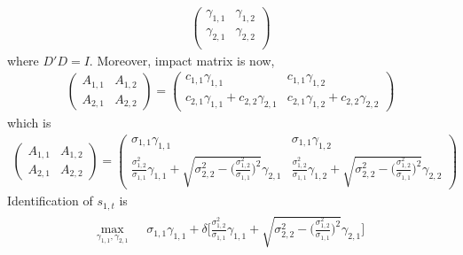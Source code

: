 \documentclass[14pt]{article}
\begin{document}
{\begin{eqnarray}
\begin{pmatrix}
\gamma_{1,1} & \gamma_{1,2} \\
\gamma_{2,1} & \gamma_{2,2} \\
\end{pmatrix} 
\end{eqnarray}
where $D'D = I$. Moreover, impact matrix is now,
\begin{eqnarray}
\begin{pmatrix}
A_{1,1} & A_{1,2} \\
A_{2,1} & A_{2,2}
\end{pmatrix} = \begin{pmatrix}
c_{1,1} \gamma_{1,1} & c_{1,1} \gamma_{1,2} \\
c_{2,1} \gamma_{1,1} + c_{2,2} \gamma_{2,1} & c_{2,1} \gamma_{1,2} + c_{2,2} \gamma_{2,2}
\end{pmatrix}
\end{eqnarray}
which is
\begin{eqnarray}
\begin{pmatrix}
A_{1,1} & A_{1,2} \\
A_{2,1} & A_{2,2}
\end{pmatrix} = \begin{pmatrix}
\sigma_{1,1} \gamma_{1,1} & \sigma_{1,1} \gamma_{1,2} \\
\frac{\sigma_{1,2}^2}{\sigma_{1,1}} \gamma_{1,1} + \sqrt{\sigma_{2,2}^2 - \Big( \frac{\sigma_{1,2}^2}{\sigma_{1,1}} \Big)^2} \gamma_{2,1} & \frac{\sigma_{1,2}^2}{\sigma_{1,1}} \gamma_{1,2} + \sqrt{\sigma_{2,2}^2 - \Big( \frac{\sigma_{1,2}^2}{\sigma_{1,1}} \Big)^2} \gamma_{2,2}
\end{pmatrix}
\end{eqnarray}
Identification of $s_{1,t}$ is
\begin{eqnarray}\label{eq:problem_Gam1}
\begin{aligned}
\max_{\gamma_{1,1},\gamma_{2,1}} \ \ & \ \sigma_{1,1} \gamma_{1,1} + \delta \Bigg[ \frac{\sigma_{1,2}^2}{\sigma_{1,1}}  \gamma_{1,1} + \sqrt{\sigma_{2,2}^2 - \Big( \frac{\sigma_{1,2}^2}{\sigma_{1,1}} \Big)^2} \gamma_{2,1}   \Bigg] \\

\end{aligned}
\end{eqnarray}}
\end{document}
